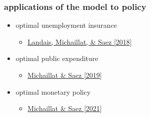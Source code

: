 \documentclass[12pt,xcolor={dvipsnames},hyperref={pdftex,pdfpagemode=UseNone,hidelinks,pdfdisplaydoctitle=true},usepdftitle=false]{beamer}
\begin{document}
\begin{frame}
\frametitle{applications of the model to policy}
\begin{itemize}
\item optimal unemployment insurance
\begin{itemize}
\item \href{https://www.pascalmichaillat.org/4.html}{Landais, Michaillat, \& Saez [2018]}
\end{itemize}
\item optimal public expenditure
\begin{itemize}
\item \href{https://www.pascalmichaillat.org/6.html}{Michaillat \& Saez [2019]}
\end{itemize}
\item optimal monetary policy
\begin{itemize}
\item \href{https://www.pascalmichaillat.org/7.html}{Michaillat \& Saez [2021]}
\end{itemize}
\end{itemize}
\end{frame}
\end{document}
